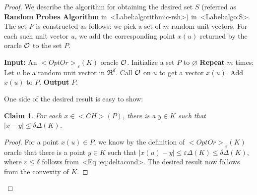 \documentclass[11pt,letterpaper]{article}
\def\mathsf#1{<#1>}%
\def\Cref#1{<Label:#1>}%
\def\eqref#1{<Eq.:#1>}%
\newtheorem{claim}[theorem]{Claim}
\theoremstyle{definition}
\theoremstyle{remark}
\renewcommand{\emptyset}{\varnothing}
\newcommand{\CH}{{\mathsf {CH}}}
\newcommand{\opto}{{\mathsf{OptOr}}}
\begin{document}
\begin{proof}
  We describe the algorithm for obtaining the desired set $S$ (referred as {\bf Random Probes Algorithm } in~\Cref{algorithmic-rsh})  in~\Cref{algo:S}. The set $P$ is constructed as follows: we pick a set  of $m$ random unit vectors. For each such unit vector $u$, we add the corresponding point $x(u)$ returned by the  oracle $\cal O$ to the set $P$. 

  \begin{algorithm}[H]
  \caption{Algorithm for finding the set $P$ such that $\CH(P)$ approximates $K$.}
  \label{algo:S}
    {\bf Input:} An $\opto_\varepsilon(K)$ oracle  $\cal O $. \;
        Initialize a set $P$ to $\emptyset$ \;
       {\bf Repeat} $m$ times:  \;
            \quad Let $u$ be a random unit vector in $\Re^d$. \;
            \quad Call $\cal O$ on $u$ to get a vector $x(u)$. \;
            \quad Add $x(u)$ to $P$. \;
        {\bf Output} $P$. 
\end{algorithm}

One side of the desired result is easy to show:
\begin{claim}
    \label{cl:Haus1}
    For each $x \in \CH(P)$, there is a $y \in K$ such that $|x-y| \leq \delta \Delta(K)$. 
\end{claim}
\begin{proof}
    For a point $x(u) \in P$, we know by the definition of $\opto_\varepsilon(K)$ oracle that there is a point $y \in K$ such that 
    $|x(u) - y| \leq \varepsilon \Delta(K) \leq \delta \Delta(K)$, where $\varepsilon \leq \delta$ follows from~\eqref{eq:deltacond}. The desired result now follows from the convexity of $K$. 
\end{proof}


\end{proof}
\end{document}
